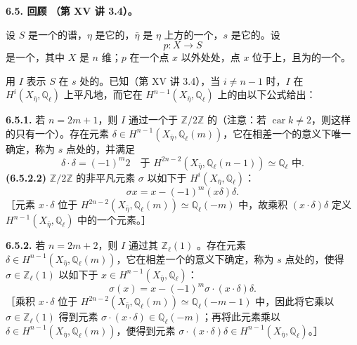 \textbf{6.5. 回顾 （第 XV 讲 3.4）。}

设 $S$ 是一个的谱，$\eta$ 是它的，$\bar\eta$ 是 $\eta$ 上方的一个，$s$ 是它的。设
\[
p:X\longrightarrow S
\]
是一个，其中 $X$ 是 $n$ 维；$p$ 在一个点 $x$ 以外处处，点 $x$ 位于上，且为的一个。

用 $I$ 表示 $S$ 在 $s$ 处的。已知（第 XV 讲 3.4），当 $i\neq n-1$ 时，$I$ 在 $H^i(X_{\bar\eta},\mathbb Q_\ell)$ 上平凡地，而它在 $H^{n-1}(X_{\bar\eta},\mathbb Q_\ell)$ 上的由以下公式给出：

\textbf{6.5.1.} 若 $n=2m+1$，则 $I$ 通过一个于 $\mathbb Z/2\mathbb Z$ 的（注意：若 $\operatorname{car}k\neq2$，则这样的只有一个）。存在元素 $\delta\in H^{n-1}(X_{\bar\eta},\mathbb Q_\ell(m))$，它在相差一个的意义下唯一确定，称为 $s$ 点处的，并满足
\[
\delta\cdot\delta=(-1)^m2
\quad\text{于 }H^{2n-2}(X_{\bar\eta},\mathbb Q_\ell(n-1))\simeq\mathbb Q_\ell\text{ 中}.
\tag{6.5.1.1}
\]
\textbf{(6.5.2.2)} $\mathbb Z/2\mathbb Z$ 的非平凡元素 $\sigma$ 以如下于 $H^i(X_{\bar\eta},\mathbb Q_\ell)$：
\[
\sigma x=x-(-1)^m(x\delta)\delta.
\]
［元素 $x\cdot\delta$ 位于 $H^{2n-2}(X_{\bar\eta},\mathbb Q_\ell(m))\simeq\mathbb Q_\ell(-m)$ 中，故乘积 $(x\cdot\delta)\delta$ 定义 $H^{n-1}(X_{\bar\eta},\mathbb Q_\ell)$ 中的一个元素。］

\textbf{6.5.2.} 若 $n=2m+2$，则 $I$ 通过其 $\mathbb Z_\ell(1)$ 。存在元素 $\delta\in H^{n-1}(X_{\bar\eta},\mathbb Q_\ell(m))$，它在相差一个的意义下确定，称为 $s$ 点处的，使得 $\sigma\in\mathbb Z_\ell(1)$ 以如下于 $x\in H^{n-1}(X_{\bar\eta},\mathbb Q_\ell)$：
\[
\sigma(x)=x-(-1)^m\sigma\cdot(x\cdot\delta)\delta.
\tag{6.5.2.1}
\]
［乘积 $x\cdot\delta$ 位于 $H^{2n-2}(X_{\bar\eta},\mathbb Q_\ell(m))\simeq\mathbb Q_\ell(-m-1)$ 中，因此将它乘以 $\sigma\in\mathbb Z_\ell(1)$ 得到元素 $\sigma\cdot(x\cdot\delta)\in\mathbb Q_\ell(-m)$；再将此元素乘以 $\delta\in H^{n-1}(X_{\bar\eta},\mathbb Q_\ell(m))$，便得到元素 $\sigma\cdot(x\cdot\delta)\delta\in H^{n-1}(X_{\bar\eta},\mathbb Q_\ell)$。］

